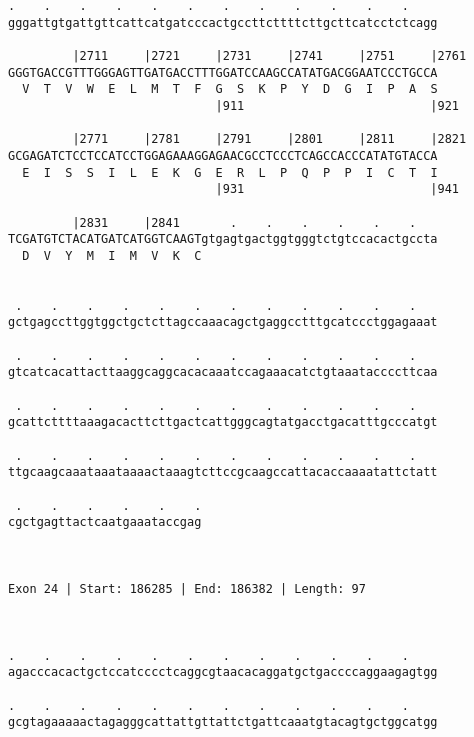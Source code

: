\documentclass{article}
\begin{document}
\begin{Verbatim}
.    .    .    .    .    .    .    .    .    .    .    .    
gggattgtgattgttcattcatgatcccactgccttcttttcttgcttcatcctctcagg
                                                            
         |2711     |2721     |2731     |2741     |2751     |2761
GGGTGACCGTTTGGGAGTTGATGACCTTTGGATCCAAGCCATATGACGGAATCCCTGCCA
  V  T  V  W  E  L  M  T  F  G  S  K  P  Y  D  G  I  P  A  S
                             |911                          |921
  
         |2771     |2781     |2791     |2801     |2811     |2821
GCGAGATCTCCTCCATCCTGGAGAAAGGAGAACGCCTCCCTCAGCCACCCATATGTACCA
  E  I  S  S  I  L  E  K  G  E  R  L  P  Q  P  P  I  C  T  I
                             |931                          |941
  
         |2831     |2841       .    .    .    .    .    .   
TCGATGTCTACATGATCATGGTCAAGTgtgagtgactggtgggtctgtccacactgccta
  D  V  Y  M  I  M  V  K  C                                 
                                                            
  
 .    .    .    .    .    .    .    .    .    .    .    .   
gctgagccttggtggctgctcttagccaaacagctgaggcctttgcatccctggagaaat
                                                            
 .    .    .    .    .    .    .    .    .    .    .    .   
gtcatcacattacttaaggcaggcacacaaatccagaaacatctgtaaataccccttcaa
                                                            
 .    .    .    .    .    .    .    .    .    .    .    .   
gcattcttttaaagacacttcttgactcattgggcagtatgacctgacatttgcccatgt
                                                            
 .    .    .    .    .    .    .    .    .    .    .    .   
ttgcaagcaaataaataaaactaaagtcttccgcaagccattacaccaaaatattctatt
                                                            
 .    .    .    .    .    .
cgctgagttactcaatgaaataccgag
                           
                           
 
Exon 24 | Start: 186285 | End: 186382 | Length: 97



.    .    .    .    .    .    .    .    .    .    .    .    
agacccacactgctccatcccctcaggcgtaacacaggatgctgaccccaggaagagtgg
                                                            
.    .    .    .    .    .    .    .    .    .    .    .    
gcgtagaaaaactagagggcattattgttattctgattcaaatgtacagtgctggcatgg
                                                            

\end{Verbatim}
\end{document}

